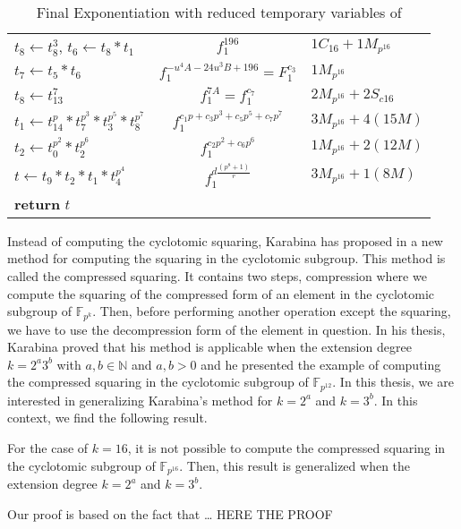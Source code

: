 \begin{center}
\begin{table}[!ht]
{\begin{tabular}{l|c|l}
			$t_{8} \leftarrow t_{8}^3$, $t_{6} \leftarrow t_{8}*t_{1}$&$f_1^{196}$&$1C_{16}+1M_{p^{16}}$\\
			$t_{7} \leftarrow t_{5}*t_{6}$&$f_1^{-u^4A-24u^3B+196}=F_1^{c_3}$&$1M_{p^{16}}$\\
			$t_{8} \leftarrow t_{13}^{7}$&$f_1^{7A}=f_1^{c_7}$&$2M_{p^{16}}+2S_{c16}$\\
			$t_{1} \leftarrow t_{14}^{p}* t_{7}^{p^3}* t_{3}^{p^5}* t_{8}^{p^7}$&$f_1^{c_1p+c_3p^3+c_5p^5+c_7p^7}$&$3M_{p^{16}}+4(15M)$\\
			$t_{2} \leftarrow t_{0}^{p^2}* t_{2}^{p^6}$&$f_1^{c_2p^2+c_6p^6}$&$1M_{p^{16}}+2(12M)$\\
			$t \leftarrow t_{9}*t_{2}*t_{1}*t_{4}^{p^4}$&$f_1^{d{\frac{(p^8+1)}{r}}}$&$3M_{p^{16}}+1(8M)$\\
			\textbf{return} $t$ & &\\
			\hline
		\end{tabular}
		}
		\caption{Final Exponentiation with reduced temporary variables of \cite{EPRINT:GhaFou16b}}
		\label{algo_final}
	\end{table}
\end{center}
\vspace{8mm}


Instead of computing the cyclotomic squaring, Karabina has proposed in \cite{Karabina13Squaring} a new method for computing the squaring in the cyclotomic subgroup. This method is called the compressed squaring. It contains two steps, compression where we compute the squaring of the compressed form of an element in the cyclotomic subgroup of $\mathbb{F}_{p^k}$. Then, before performing another operation except the squaring, we have to use the decompression form of the element in question.
In his thesis, Karabina proved that his method is applicable when the extension degree $k=2^a3^b$ with $a, b \in \mathbb{N}$ and  $a, b>0$ and he presented the example of computing the compressed squaring in the cyclotomic subgroup of $\mathbb{F}_{p^{12}}$.
In this thesis, we are interested in generalizing Karabina's method for  $k=2^a$ and $k=3^b$. In this context, we find the following result.
\begin{prop}
For the case of $k=16$, it is not possible to compute the compressed squaring in the cyclotomic subgroup of $\mathbb{F}_{p^{16}}$. Then, this result is generalized when the extension degree $k=2^a$ and $k=3^b$.
\end{prop}
Our proof is based on the fact that \dots 
HERE THE PROOF\\

